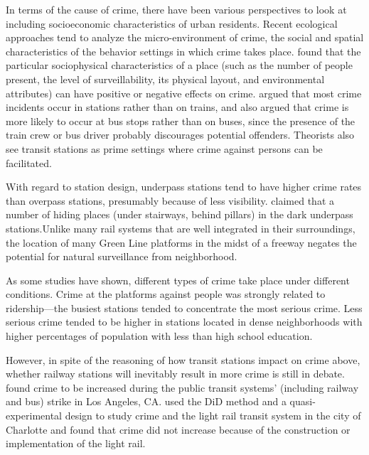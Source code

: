 \documentclass[a4paper, 11pt]{article}
\begin{document}
In terms of the cause of crime, there have been various perspectives to look at including socioeconomic characteristics of urban residents. Recent ecological approaches tend to analyze the micro-environment of crime, the social and spatial characteristics of the behavior settings in which crime takes place. \cite{felson1994crime} found that the particular sociophysical characteristics of a place (such as the number of people present, the level of surveillability, its physical layout, and environmental attributes) can have positive or negative effects on crime. \cite{degeneste1994policing} argued that most crime incidents occur in stations rather than on trains, and \cite{bus} also argued that crime is more likely to occur at bus stops rather than on buses, since the presence of the train crew or bus driver probably discourages potential offenders. Theorists also see transit stations as prime settings where crime against persons can be facilitated.


With regard to station design, underpass stations tend to have higher crime rates than overpass stations, presumably because of less visibility. \cite{environment} claimed that a number of hiding places (under stairways, behind pillars) in the dark underpass stations.Unlike many rail systems that are well integrated in their surroundings, the location of many Green Line platforms in the midst of a freeway negates the potential for natural surveillance from neighborhood.

As some studies have shown, different types of crime take place under different conditions. Crime at the platforms against people was strongly related to ridership—the busiest stations tended to concentrate the most serious crime. Less serious crime tended to be higher in stations located in dense neighborhoods with higher percentages of population with less than high school education. 

However, in spite of the reasoning of how transit stations impact on crime above, whether railway stations will inevitably result in more crime is still in debate. \cite{mass} found crime to be increased during the public transit systems’ (including railway and bus) strike in Los Angeles, CA. \cite{doi:10.1111/j.1467-9906.2011.00564.x} used the DiD method and a quasi-experimental design to study crime and the light rail transit system in the city of Charlotte and found that crime did not increase because of the construction or implementation of the light rail.
\end{document}
